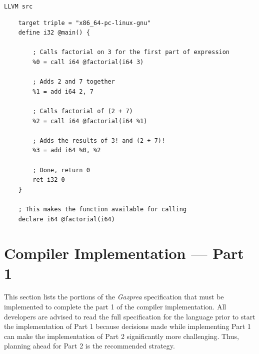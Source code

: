 \documentclass{article}
\begin{document}
    \texttt{LLVM src}
    \begin{lstlisting}
    target triple = "x86_64-pc-linux-gnu"
    define i32 @main() {

        ; Calls factorial on 3 for the first part of expression
        %0 = call i64 @factorial(i64 3)

        ; Adds 2 and 7 together
        %1 = add i64 2, 7

        ; Calls factorial of (2 + 7)
        %2 = call i64 @factorial(i64 %1)

        ; Adds the results of 3! and (2 + 7)!
        %3 = add i64 %0, %2

        ; Done, return 0
        ret i32 0
    }

    ; This makes the function available for calling
    declare i64 @factorial(i64)
    \end{lstlisting}

\section{Compiler Implementation --- Part 1}\label{sec:part1}
  This section lists the portions of the  \textit{Gazprea} specification that must be implemented to complete the part 1 of the compiler implementation.
All developers are advised to read the full
  specification for the language prior to start the implementation of Part 1 because decisions made while implementing Part 1 can make the implementation of Part 2 significantly more challenging. Thus, planning ahead for Part 2 is the recommended strategy.
\end{document}

